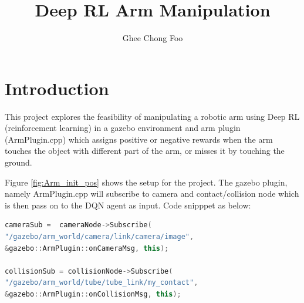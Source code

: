 \documentclass[10pt,journal,compsoc]{IEEEtran}
\begin{document}
\title{Deep RL Arm Manipulation}

\author{Ghee Chong Foo}

%
{}


\maketitle
\IEEEdisplaynontitleabstractindextext
\IEEEpeerreviewmaketitle
\section{Introduction}
\label{sec:introduction}

\IEEEPARstart
{T}his project explores the feasibility of manipulating a robotic arm using Deep RL (reinforcement learning) in a gazebo environment and arm plugin (ArmPlugin.cpp) which assigns positive or negative rewards when the arm touches the object with different part of the arm, or misses it by touching the ground. 

Figure \ref{fig:Arm_init_pos} shows the setup for the project.  The gazebo plugin, namely ArmPlugin.cpp will subscribe to camera and contact/collision node which is then pass on to the DQN agent as input.  Code snipppet as below:

\begin{lstlisting}[language=C++]
cameraSub =  cameraNode->Subscribe( 
"/gazebo/arm_world/camera/link/camera/image",
&gazebo::ArmPlugin::onCameraMsg, this);
            
collisionSub = collisionNode->Subscribe( 
"/gazebo/arm_world/tube/tube_link/my_contact",
&gazebo::ArmPlugin::onCollisionMsg, this);
\end{lstlisting}


\end{document}
